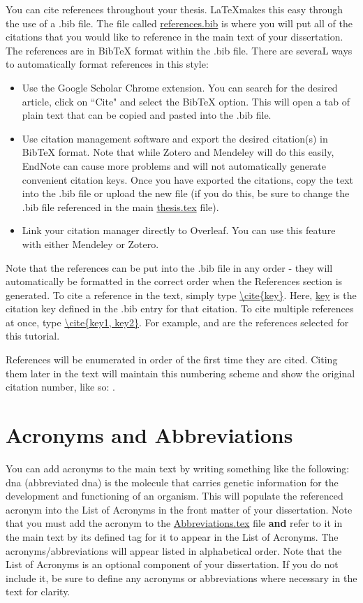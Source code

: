 You can cite references throughout your thesis. \LaTeX makes this easy through the use of a .bib file. The file called \url{references.bib} is where you will put all of the citations that you would like to reference in the main text of your dissertation. The references are in BibTeX format within the .bib file. There are severaL ways to automatically format references in this style:

\begin{itemize}
    \item Use the Google Scholar Chrome extension. You can search for the desired article, click on ``Cite" and select the BibTeX option. This will open a tab of plain text that can be copied and pasted into the .bib file.
    \item Use citation management software and export the desired citation(s) in BibTeX format. Note that while Zotero and Mendeley will do this easily, EndNote can cause more problems and will not automatically generate convenient citation keys. Once you have exported the citations, copy the text into the .bib file or upload the new file (if you do this, be sure to change the .bib file referenced in the main \url{thesis.tex} file).
    \item Link your citation manager directly to Overleaf. You can use this feature with either Mendeley or Zotero.
\end{itemize}

Note that the references can be put into the .bib file in any order - they will automatically be formatted in the correct order when the References section is generated. To cite a reference in the text, simply type \url{\cite{key}}. Here, \url{key} is the citation key defined in the .bib entry for that citation. To cite multiple references at once, type \url{\cite{key1, key2}}. For example, \cite{ref1, ref2} and \cite{ref3} are the references selected for this tutorial.

References will be enumerated in order of the first time they are cited. Citing them later in the text will maintain this numbering scheme and show the original citation number, like so: \cite{ref1}.

\section{Acronyms and Abbreviations}

You can add acronyms to the main text by writing something like the following: \acrlong{dna} (abbreviated \acrshort{dna}) is the molecule that carries genetic information for the development and functioning of an organism. This will populate the referenced acronym into the List of Acronyms in the front matter of your dissertation. Note that you must add the acronym to the \url{Abbreviations.tex} file \textbf{and} refer to it in the main text by its defined tag for it to appear in the List of Acronyms. The acronyms/abbreviations will appear listed in alphabetical order. Note that the List of Acronyms is an optional component of your dissertation. If you do not include it, be sure to define any acronyms or abbreviations where necessary in the text for clarity.

